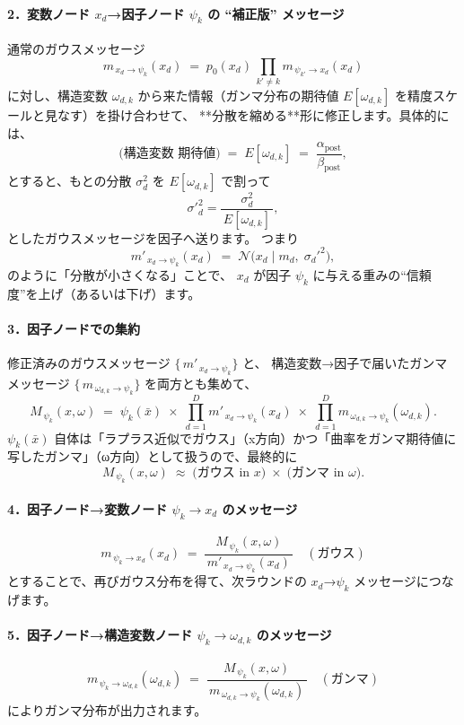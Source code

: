 \documentclass[oneside,onecolumn]{jlreq}
\theoremstyle{plain}
\begin{document}
\paragraph{2．変数ノード \(x_d\)→因子ノード \(\psi_k\) の “補正版” メッセージ}
通常のガウスメッセージ
\[
    m_{\,x_d\to \psi_k}(x_d)
    \;=\;
    p_{0}(x_d)\,\prod_{k'\neq k} m_{\,\psi_{k'}\to x_d}(x_d)
\]
に対し、構造変数 \(\omega_{d,k}\) から来た情報（ガンマ分布の期待値
\(E[\omega_{d,k}]\) を精度スケールと見なす）を掛け合わせて、
**分散を縮める**形に修正します。具体的には、
\[
    \text{(構造変数 期待値)}
    \;=\; E[\omega_{d,k}]
    \;=\; \frac{\alpha_{\mathrm{post}}}{\beta_{\mathrm{post}}},
\]
とすると、もとの分散 \(\sigma_d^2\) を \(E[\omega_{d,k}]\) で割って
\[
    \sigma'^2_d = \frac{\sigma_d^2}{\,E[\omega_{d,k}]\,},
\]
としたガウスメッセージを因子へ送ります。
つまり
\[
    m'_{\,x_d\to \psi_k}(x_d)
    \;=\;
    \mathcal{N}\bigl(x_d \mid m_d,\;\sigma_d'^2 \bigr),
\]
のように「分散が小さくなる」ことで、
\(x_d\) が因子 \(\psi_k\) に与える重みの“信頼度”を上げ（あるいは下げ）ます。

\paragraph{3．因子ノードでの集約}
修正済みのガウスメッセージ \(\{\,m'_{\,x_d\to \psi_k}\}\) と、
構造変数→因子で届いたガンマメッセージ \(\{\,m_{\,\omega_{d,k}\to \psi_k}\}\) を両方とも集めて、
\[
    M_{\,\psi_k}(x,\omega)
    \;=\;
    \psi_k(\bar x)\;\times\;
    \prod_{d=1}^D m'_{\,x_d\to \psi_k}(x_d)\;\times\;
    \prod_{d=1}^D m_{\,\omega_{d,k}\to \psi_k}(\omega_{d,k}).
\]
\(\psi_k(\bar x)\) 自体は「ラプラス近似でガウス」（x方向）かつ「曲率をガンマ期待値に写したガンマ」（ω方向）として扱うので、最終的に
\[
  M_{\,\psi_k}(x,\omega)
  \;\approx\;
  \bigl(\text{ガウス in }x\bigr)
  \;\times\;
  \bigl(\text{ガンマ in }\omega\bigr).
\]

\paragraph{4．因子ノード→変数ノード \(\psi_k\to x_d\) のメッセージ}
\[
    m_{\,\psi_k \to x_d}(x_d)
    \;=\;
    \frac{\,M_{\,\psi_k}(x,\omega)\,}{\,m'_{\,x_d \to \psi_k}(x_d)\,}
    \quad(\text{ガウス})
\]
とすることで、再びガウス分布を得て、次ラウンドの \(x_d\)→\(\psi_k\) メッセージにつなげます。

\paragraph{5．因子ノード→構造変数ノード \(\psi_k\to \omega_{d,k}\) のメッセージ}
\[
    m_{\,\psi_k \to \omega_{d,k}}(\omega_{d,k})
    \;=\;
    \frac{\,M_{\,\psi_k}(x,\omega)\,}{\,m_{\,\omega_{d,k}\to \psi_k}(\omega_{d,k})\,}
    \quad(\text{ガンマ})
\]
によりガンマ分布が出力されます。
\end{document}
